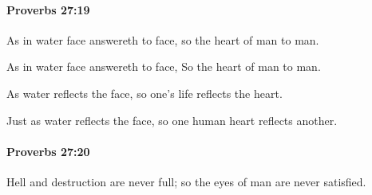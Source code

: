 		\paragraph{Proverbs 27:19} %
			\label{PROVERBS-27-19}

			As in water face answereth to face, so the heart of man to man.

			\begin{versebox}
					\item[BHS] 
					\item[ASV] As in water face answereth to face, So the heart of man to man.
					\item[NIV] As water reflects the face, so one’s life reflects the heart.
					\item[NRSV] Just as water reflects the face, so one human heart reflects another.
			\end{versebox}

		\paragraph{Proverbs 27:20} %
			\label{PROVERBS-27-20}

			Hell and destruction are never full; so the eyes of man are never satisfied.

